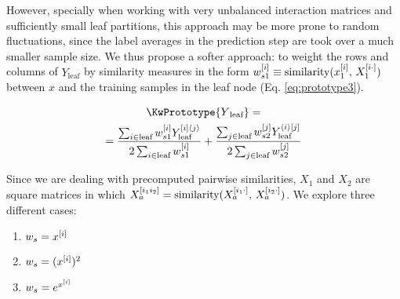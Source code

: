 However, specially when working with very unbalanced interaction matrices and sufficiently small leaf partitions, this approach may be more prone to random fluctuations, since the label averages in the prediction step are took over a much smaller sample size. We thus propose a softer approach: to weight the rows and columns of $Y_\text{leaf}$ by similarity measures in the form $w_{s1}^{[i]} \equiv \text{similarity}(x_1^{[i]}, \, X_1^{[i\cdot]})$ between $x$ and the training samples in the leaf node (Eq. \ref{eq:prototype3}).

\begin{multline}
    \KwPrototype{Y\textsubscript{leaf}} =\\
    =\frac{
        \sum_{i\in \text{leaf}}
            w_{s1}\el i
            Y_\text{leaf}^{[i]\angled j}
    }{
        2\sum_{i\in \text{leaf}}
            w_{s1}\el i
    }
    +
    \frac{
        \sum_{j\in \text{leaf}}
            w_{s2}\el j
            Y_\text{leaf}^{\angled i[j]}
    }{
        2\sum_{j\in \text{leaf}}
            w_{s2}\el j
    }
    \label{eq:prototype3}
\end{multline}

Since we are dealing with precomputed pairwise similarities, $X_1$ and $X_2$ are square matrices in which $X_a^{[i_1i_2]} = \text{similarity}(X_a^{[i_1\cdot]},\, X_a ^{[i_2\cdot]})$. We explore three different cases:

\begin{enumerate}
    \item $w_s = x^{[i]}$
    \item $w_s = (x^{[i]} )^2$
    \item $w_s = e^{x^{[i]}}$
\end{enumerate}

